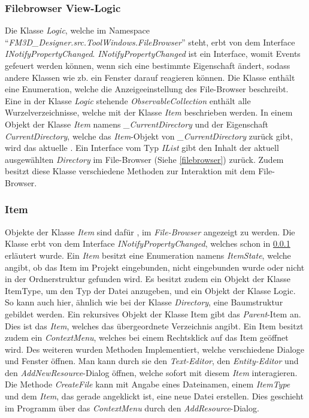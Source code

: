 \subsubsection{Filebrowser View-Logic}
\label{fbview}
Die Klasse \textit{Logic}, welche im Namespace "`\textit{FM3D\_Designer.src.ToolWindows.FileBrowser}"' steht, erbt von dem Interface \textit{INotifyPropertyChanged}. \textit{INotifyPropertyChanged} ist ein Interface, womit Events gefeuert werden können, wenn sich eine bestimmte Eigenschaft ändert, sodass andere Klassen wie zb. ein Fenster darauf reagieren können.
Die Klasse enthält eine Enumeration, welche die Anzeigeeinstellung des File-Browser beschreibt. 
Eine in der Klasse \textit{Logic} stehende \textit{ObservableCollection} enthält alle Wurzelverzeichnisse, welche mit der Klasse \textit{Item} beschrieben werden. In einem Objekt der Klasse \textit{Item} namens \textit{\_CurrentDirectory} und der Eigenschaft \textit{CurrentDirectory}, welche das \textit{Item}-Objekt von \textit{\_CurrentDirectory} zurück gibt, wird das aktuelle . Ein Interface vom Typ \textit{IList} gibt den Inhalt der aktuell ausgewählten \textit{Directory} im File-Browser (Siehe \cref{filebrowser}) zurück. Zudem besitzt diese Klasse verschiedene Methoden zur Interaktion mit dem File-Browser.

\subsubsection{Item}
\label{item}
Objekte der Klasse \textit{Item} sind dafür , im \textit{File-Browser} angezeigt zu werden. Die Klasse erbt von dem Interface \textit{INotifyPropertyChanged}, welches schon in \cref{fbview} erläutert wurde. Ein \textit{Item} besitzt eine Enumeration namens \textit{ItemState}, welche angibt, ob das Item im Projekt eingebunden, nicht eingebunden wurde oder nicht in der Ordnerstruktur gefunden wird. Es besitzt zudem ein Objekt der Klasse ItemType, um den Typ der Datei anzugeben, und ein Objekt der Klasse Logic. So kann auch hier, ähnlich wie bei der Klasse \textit{Directory}, eine Baumstruktur gebildet werden.
Ein rekursives Objekt der Klasse Item gibt das \textit{Parent}-Item an. Dies ist das \textit{Item}, welches das übergeordnete Verzeichnis angibt.
Ein Item besitzt zudem ein \textit{ContextMenu}, welches bei einem Rechtsklick auf das Item geöffnet wird. Des weiteren wurden Methoden Implementiert, welche verschiedene Dialoge und Fenster öffnen. Man kann durch sie den \textit{Text-Editor}, den \textit{Entity-Editor} und den \textit{AddNewResource}-Dialog öffnen, welche sofort mit diesem \textit{Item} interagieren.
Die Methode \textit{CreateFile} kann mit Angabe eines Dateinamen, einem \textit{ItemType} und dem \textit{Item}, das gerade angeklickt ist, eine neue Datei erstellen. Dies geschieht im Programm über das \textit{ContextMenu} durch den \textit{AddResource}-Dialog.

